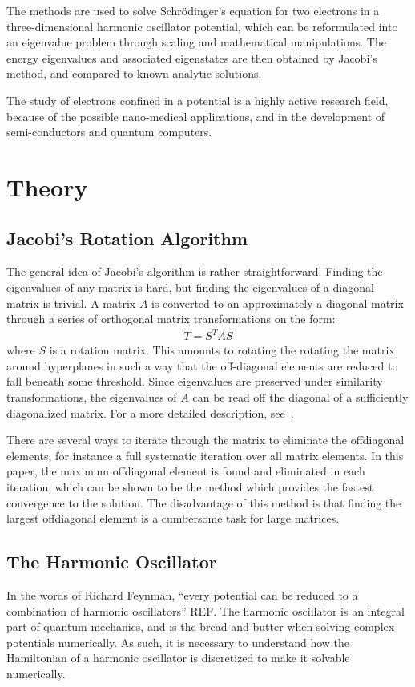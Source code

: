 \documentclass[aps,reprint]{revtex4-1}
\begin{document}
The methods are used to solve Schrödinger's equation for two electrons in a
three-dimensional harmonic oscillator potential, which can be reformulated into
an eigenvalue problem through scaling and mathematical manipulations. The
energy eigenvalues and associated eigenstates are then obtained by Jacobi's method,
and compared to known analytic solutions.

The study of electrons confined in a potential is a highly active research field,
because of the possible nano-medical applications, and in the development of semi-conductors
and quantum computers.
\section{Theory}
\label{sec:theory}
\subsection{Jacobi's Rotation Algorithm}
The general idea of Jacobi's algorithm is rather straightforward. Finding the
eigenvalues of any matrix is hard, but finding the eigenvalues of a diagonal
matrix is trivial. A matrix \(A\) is converted to an approximately a diagonal
matrix through a series of orthogonal matrix transformations on the form:
\begin{align*}
  T = S^T A S
\end{align*}
where $S$ is a rotation matrix. This amounts to rotating the rotating the matrix
around hyperplanes in such a way that the off-diagonal elements are reduced to
fall beneath some threshold.
Since eigenvalues are preserved under similarity
transformations, the eigenvalues of \(A\) can be read off the diagonal of a
sufficiently diagonalized matrix. For a more detailed description, see~\cite{mortenjensen}.

There are several ways to iterate through the matrix to eliminate the offdiagonal
elements, for instance a full systematic iteration over all matrix elements. In this paper,
the maximum offdiagonal element is found and eliminated in each iteration, which can be shown to be
the method which provides the fastest convergence to the solution. The disadvantage of this method
is that finding the largest offdiagonal element is a cumbersome task for large matrices.
\subsection{The Harmonic Oscillator}
\label{sec:harmonic}
In the words of Richard Feynman, ``every potential can be reduced to a
combination of harmonic oscillators'' REF. The harmonic oscillator is an
integral part of quantum mechanics, and is the bread and butter when solving
complex potentials numerically. As such, it is necessary to understand how the
Hamiltonian of a harmonic oscillator is discretized to make it solvable
numerically.
\end{document}
